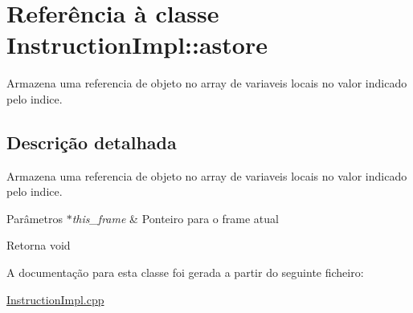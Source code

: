 \hypertarget{class_instruction_impl_1_1astore}{}\section{Referência à classe Instruction\+Impl\+:\+:astore}
\label{class_instruction_impl_1_1astore}


Armazena uma referencia de objeto no array de variaveis locais no valor indicado pelo indice.  




\subsection{Descrição detalhada}
Armazena uma referencia de objeto no array de variaveis locais no valor indicado pelo indice. 


\begin{DoxyParams}{Parâmetros}
{\em $\ast$this\+\_\+frame} & Ponteiro para o frame atual \\
\hline
\end{DoxyParams}
\begin{DoxyReturn}{Retorna}
void 
\end{DoxyReturn}


A documentação para esta classe foi gerada a partir do seguinte ficheiro\+:\begin{DoxyCompactItemize}
\item 
\hyperlink{_instruction_impl_8cpp}{Instruction\+Impl.\+cpp}\end{DoxyCompactItemize}
